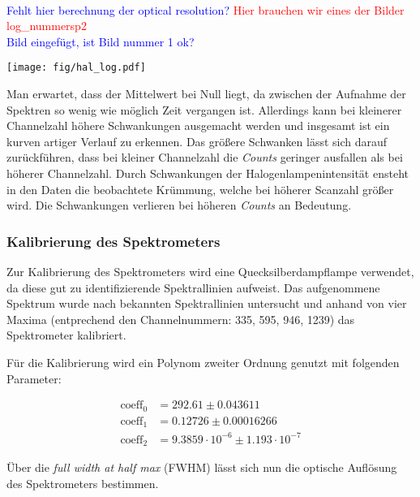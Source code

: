 \documentclass[12pt, a4paper, bibliography=totoc]{scrartcl}
\begin{document}
\begin{multicols}{2}
\\
\textcolor{blue}{Fehlt hier berechnung der optical resolution?}
\textcolor{red}{Hier brauchen wir eines der Bilder log\_nummersp2} \\
\textcolor{blue}{Bild eingefügt, ist Bild nummer 1 ok?}
\\

\begin{center}
    \texttt{[image: fig/hal\_log.pdf]}
    \label{fig:hal_log}
\end{center}


Man erwartet, dass der Mittelwert bei Null liegt, da zwischen der Aufnahme der Spektren so wenig wie möglich Zeit vergangen ist. Allerdings kann bei kleinerer Channelzahl höhere Schwankungen ausgemacht werden und insgesamt ist ein kurven artiger Verlauf zu erkennen.
Das größere Schwanken lässt sich darauf zurückführen, dass bei kleiner Channelzahl die \textit{Counts} geringer ausfallen als bei höherer Channelzahl.
Durch Schwankungen der Halogenlampenintensität ensteht in den Daten die beobachtete Krümmung, welche bei höherer Scanzahl größer wird. Die Schwankungen verlieren bei höheren \textit{Counts} an Bedeutung.

\subsubsection{Kalibrierung des Spektrometers}\label{sssec:calibrating_the_spectrometer}

Zur Kalibrierung des Spektrometers wird eine Quecksilberdampflampe verwendet, da diese gut zu identifizierende Spektrallinien aufweist.
Das aufgenommene Spektrum wurde nach bekannten Spektrallinien untersucht und anhand von vier Maxima (entprechend den Channelnummern: 335, 595, 946, 1239) das Spektrometer kalibriert. 

Für die Kalibrierung wird ein Polynom zweiter Ordnung genutzt mit folgenden Parameter: 

\begin{align}
    \text{coeff}_0 &= 292.61 \pm 0.043611\\
    \text{coeff}_1 &= 0.12726 \pm 0.00016266\\
    \text{coeff}_2 &= 9.3859 \cdot 10^{-6} \pm 1.193 \cdot 10^{-7} 
\end{align}
 
Über die \textit{full width at half max} (FWHM) lässt sich nun die optische Auflösung des Spektrometers bestimmen.


\end{multicols}
\end{document}
